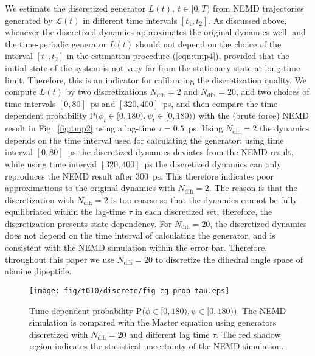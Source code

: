 \documentclass[aps, pre, preprint,unsortedaddress,a4paper,onecolumn]{revtex4}
\newcommand{\recheck}[1]{{\color{red} #1}}
\newcommand{\ml}[0]{\mathcal {L}}
\newcommand{\prob}{\textrm{P}}
\newcommand{\dih}{\textrm{dih}}
\begin{document}
We estimate the discretized generator $L(t), \ t\in[0,T)$
from NEMD trajectories generated by $\ml(t)$ in different time intervals $[t_1,
t_2]$.
\recheck{As discussed above, }whenever  the discretized dynamics approximates the original
dynamics well, and the time-periodic generator $L(t)$ should not depend on the choice of the interval $[t_1,t_2]$ in the estimation procedure (\ref{eqn:tmp4}), provided that the initial state of the system
is not very far from the stationary state at long-time limit.
Therefore, this is an indicator for calibrating the discretization quality.
We compute $L(t)$ by two discretizations $N_\dih=2$ and $N_\dih=20$, and two
choices of time intervals $[0, 80]$~ps and $[320, 400]$~ps, and then
compare the time-dependent probability $\prob\big(\phi_t\in[0,180), \psi_t\in [0,180)\big)$
with the (brute force) NEMD result in Fig.~\ref{fig:tmp2} using a lag-time $\tau=0.5$~ps.
Using $N_\dih=2$ the dynamics depends on the time interval used for
calculating the generator: using time interval $[0, 80]$~ps the discretized
dynamics deviates from the NEMD result,
while using time interval $[320, 400]$~ps the discretized dynamics can only
reproduces the NEMD result after 300~ps.  This therefore indicates poor 
approximations to the original dynamics with $N_\dih=2$. The reason is that the
discretization with $N_\dih=2$ is too coarse so that the dynamics cannot be fully
equilibriated within the lag-time $\tau$ in each discretized set,
therefore, the discretization presents state dependency.  For
$N_\dih=20$, the discretized dynamics does not depend on the time interval of
calculating the generator, and is consistent with the
NEMD simulation within the error bar. Therefore, throughout this paper we use $N_\dih=20$
to discretize  the dihedral angle space of alanine dipeptide.


\begin{figure}
  \centering
  \texttt{[image: fig/t010/discrete/fig-cg-prob-tau.eps]}  
  \caption{Time-dependent probability $\prob\big(\phi\in[0,180), \psi\in [0,180)\big)$.  The NEMD simulation is compared with the Master equation using generators discretized with $N_\dih=20$ and different lag time $\tau$. The red shadow region indicates the
    statistical uncertainty of the NEMD simulation.}
  \label{fig:tmp3}
\end{figure}
\end{document}
